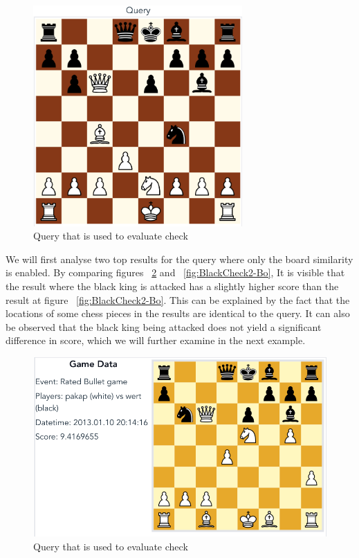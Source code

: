 \documentclass[11pt]{article}
\begin{document}
    \begin{figure}[H]
        \centering
        \includegraphics[width=8cm]{images/QueryBlackCheck}
        \caption{Query that is used to evaluate check}
        \label{fig:BlackCheckQuery}
    \end{figure}

    We will first analyse two top results for the query where only the board similarity is enabled. By comparing figures ~\ref{fig:BlackCheck1-Bo} and ~\ref{fig:BlackCheck2-Bo}, It is visible that the result where the black king is attacked has a slightly higher score than the result at figure ~\ref{fig:BlackCheck2-Bo}. This can be explained by the fact that the locations of some chess pieces in the results are identical to the query. It can also be observed that the black king being attacked does not yield a significant difference in score, which we will further examine in the next example.

    \begin{figure}[H]
        \centering
        \includegraphics[width=12cm]{images/BlackCheck1-Bo}
        \caption{Query that is used to evaluate check}
        \label{fig:BlackCheck1-Bo}
    \end{figure}
\end{document}
